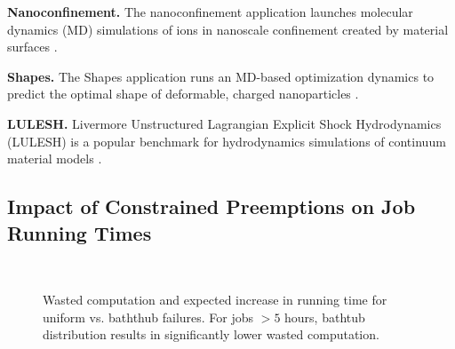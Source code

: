 
\noindent \textbf{Nanoconfinement.}
The nanoconfinement application launches molecular dynamics (MD) simulations of ions in nanoscale confinement created by material surfaces \cite{jing2015ionic,kadupitiya2017}.

\noindent \textbf{Shapes.} The Shapes application runs an MD-based optimization dynamics to predict the optimal shape of deformable, charged nanoparticles \cite{jto1,brunk2019computational}. 

\noindent \textbf{LULESH.} Livermore Unstructured Lagrangian Explicit Shock Hydrodynamics (LULESH)  is a popular benchmark for hydrodynamics simulations of continuum material models \cite{IPDPS13:LULESH,LULESH2:changes}. 






\subsection{Impact of Constrained Preemptions on Job Running Times}

\begin{figure}[t]
  \\
    \caption{Wasted computation and expected increase in running time for uniform vs. baththub failures. For jobs $>5$ hours, bathtub distribution results in significantly lower wasted computation.}
  \label{fig:vs-uniform-both}
  
\end{figure}

